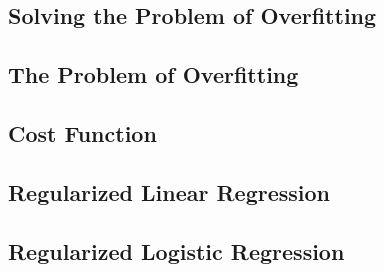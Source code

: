 \documentclass{article}
\begin{document}
\begin{CJK}{UTF8}{gbsn}
\section{Solving the Problem of Overfitting}
\subsection{The Problem of Overfitting}
\subsection{Cost Function}
\subsection{Regularized Linear Regression}
\subsection{Regularized Logistic Regression}
\end{CJK}
\end{document}

